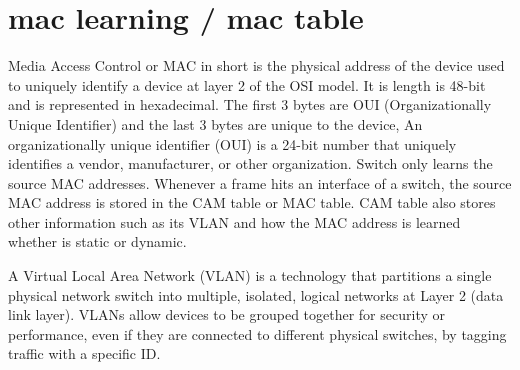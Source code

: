 \section{mac learning / mac table}
\noindent
Media Access Control or MAC in short is the physical address of the device used to uniquely identify a device at layer 2 of the OSI model. It is length is 48-bit and is represented in hexadecimal. The first 3 bytes are OUI (Organizationally Unique Identifier) and the last 3 bytes are unique to the device, An organizationally unique identifier (OUI) is a 24-bit number that uniquely identifies a vendor, manufacturer, or other organization. Switch only learns the source MAC addresses. Whenever a frame hits an interface of a switch, the source MAC address is stored in the CAM table or MAC table. CAM table also stores other information such as its VLAN and how the MAC address is learned whether is static or dynamic.

A Virtual Local Area Network (VLAN) is a technology that partitions a single physical network switch into multiple, isolated, logical networks at Layer 2 (data link layer). VLANs allow devices to be grouped together for security or performance, even if they are connected to different physical switches, by tagging traffic with a specific ID. 

